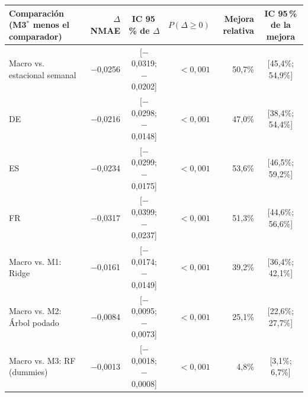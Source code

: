 \begin{tabular}{lrcrrc}
\toprule
Comparación (M3$^\ast$ menos el comparador) & $\Delta$ NMAE & IC 95\,\% de $\Delta$ & $P(\Delta\geq 0)$ & Mejora relativa & IC 95\,\% de la mejora \\
\midrule
Macro vs. estacional semanal & $-$0{,}0256 & [$-$0{,}0319; $-$0{,}0202] & $<0{,}001$ & 50{,}7\% & [45{,}4\%; 54{,}9\%] \\
\hspace{1em}DE & $-$0{,}0216 & [$-$0{,}0298; $-$0{,}0148] & $<0{,}001$ & 47{,}0\% & [38{,}4\%; 54{,}4\%] \\
\hspace{1em}ES & $-$0{,}0234 & [$-$0{,}0299; $-$0{,}0175] & $<0{,}001$ & 53{,}6\% & [46{,}5\%; 59{,}2\%] \\
\hspace{1em}FR & $-$0{,}0317 & [$-$0{,}0399; $-$0{,}0237] & $<0{,}001$ & 51{,}3\% & [44{,}6\%; 56{,}6\%] \\
\midrule
Macro vs. M1: Ridge & $-$0{,}0161 & [$-$0{,}0174; $-$0{,}0149] & $<0{,}001$ & 39{,}2\% & [36{,}4\%; 42{,}1\%] \\
Macro vs. M2: Árbol podado & $-$0{,}0084 & [$-$0{,}0095; $-$0{,}0073] & $<0{,}001$ & 25{,}1\% & [22{,}6\%; 27{,}7\%] \\
Macro vs. M3: RF (dummies) & $-$0{,}0013 & [$-$0{,}0018; $-$0{,}0008] & $<0{,}001$ & 4{,}8\% & [3{,}1\%; 6{,}7\%] \\
\bottomrule
\end{tabular}